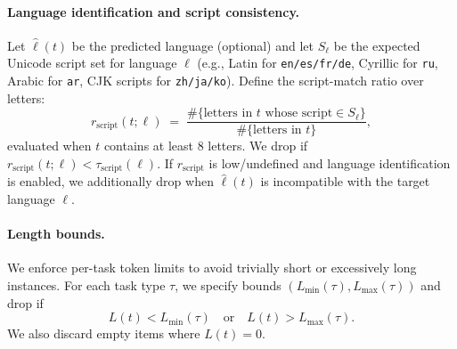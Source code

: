 \documentclass[11pt]{article}
\begin{document}
\paragraph{Language identification and script consistency.}
Let $\hat{\ell}(t)$ be the predicted language (optional) and let $S_{\ell}$ be the expected Unicode script set for language $\ell$ (e.g., Latin for \texttt{en/es/fr/de}, Cyrillic for \texttt{ru}, Arabic for \texttt{ar}, CJK scripts for \texttt{zh/ja/ko}).
Define the script-match ratio over letters:
\[
r_{\text{script}}(t;\ell) \;=\;
\frac{\#\{\text{letters in } t \text{ whose script}\in S_{\ell}\}}
{\#\{\text{letters in } t\}},
\]
evaluated when $t$ contains at least $8$ letters. We drop if $r_{\text{script}}(t;\ell) < \tau_{\text{script}}(\ell)$. If $r_{\text{script}}$ is low/undefined and language identification is enabled, we additionally drop when $\hat{\ell}(t)$ is incompatible with the target language $\ell$.

\paragraph{Length bounds.}
We enforce per-task token limits to avoid trivially short or excessively long instances. For each task type $\tau$, we specify bounds $(L_{\min}(\tau), L_{\max}(\tau))$ and drop if
\[
L(t) < L_{\min}(\tau) \quad \text{or} \quad L(t) > L_{\max}(\tau).
\]
We also discard empty items where $L(t)=0$.
\end{document}
